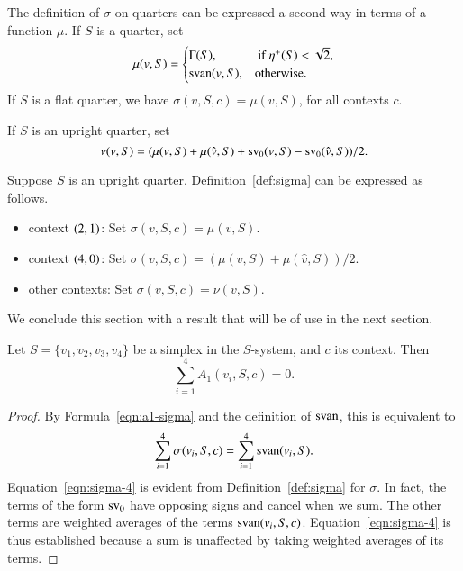 The definition of $\sigma$ on quarters can be expressed a second
way in terms of a function $\mu$.  If $S$ is a quarter, set
    \begin{equation}
    \mu(v,S)=\begin{cases}
    \Gamma(S),&  \text{ if }\eta^+(S)<\sqrt2,\\
    {\operatorname{svan}}(v,S),& \hbox{otherwise.}\end{cases}
    \label{eqn:3.8}
    \end{equation}
If $S$ is a flat quarter, we have $\sigma(v,S,c)=\mu(v,S)$, for
all contexts $c$.

\begin{definition} If $S$ is an upright quarter, set
$$\nu(v,S)=(\mu(v,S)+\mu(\hat v,S) + 
  {\operatorname{sv}}_0(v,S)-{\operatorname{sv}}_0(\hat v,S))/2.$$
\end{definition}


Suppose $S$ is an upright quarter.
Definition~\ref{def:sigma} can be expressed as follows.


\begin{itemize}
 \item context $\relax(2,1)$:  Set $\sigma(v,S,c)=\mu(v,S)$.
 \item context
    $\relax(4,0)$:  Set $\sigma(v,S,c)=(\mu(v,S)+\mu(\hat v,S))/2$.
 \item other contexts:
 Set $\sigma(v,S,c)=\nu(v,S)$.
\end{itemize}





We conclude this section with a result that will be of use in the
next section.

\begin{lemma}\label{lemma:A1-cancel}
Let $S=\{v_1,v_2,v_3,v_4\}$ be a simplex in the $S$-system,  and $c$
its context.   Then
   $$\sum_{i=1}^4 A_1(v_i,S,c)=0.$$
\end{lemma}

\begin{proof}
   By Formula~\ref{eqn:a1-sigma} and the definition of ${\operatorname{svan}}$,
this is equivalent to
      \begin{equation}
      \sum_{i=1}^4 \sigma(v_i,S,c) = \sum_{i=1}^4
      {\operatorname{svan}}(v_i,S). 
      \label{eqn:sigma-4}
      \end{equation}
Equation~\ref{eqn:sigma-4} is evident from
Definition~\ref{def:sigma} for $\sigma$.  In fact, the terms of the
form ${\operatorname{sv}}_0$ have opposing signs and cancel when we sum. The other
terms are weighted averages of the terms ${\operatorname{svan}}(v_i,S,c)$.
Equation~\ref{eqn:sigma-4} is thus established because a sum is
unaffected by taking weighted averages of its terms.
\end{proof}


